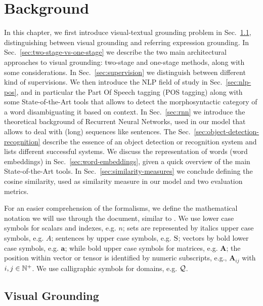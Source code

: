 
\chapter{Background}
\label{ch:background}

In this chapter, we first introduce visual-textual grounding problem
in Sec.~\ref{sec:visual-grounding}, distinguishing between visual
grounding and referring expression grounding. In
Sec.~\ref{sec:two-stage-vs-one-stage} we describe the two main
architectural approaches to visual grounding: two-stage and one-stage
methods, along with some considerations. In Sec.~\ref{sec:supervision}
we distinguish between different kind of supervisions. We then
introduce the NLP field of study in Sec.~\ref{sec:nlp-pos}, and in
particular the Part Of Speech tagging (POS tagging) along with some
State-of-the-Art tools that allows to detect the morphosyntactic
category of a word disambiguating it based on context. In
Sec.~\ref{sec:rnn} we introduce the theoretical background of
Recurrent Neural Networks, used in our model that allows to deal with
(long) sequences like sentences. The
Sec.~\ref{sec:object-detection-recognition} describe the essence of an
object detection or recognition system and lists different successful
systems. We discuss the representation of words (word embeddings) in
Sec.~\ref{sec:word-embeddings}, given a quick overview of the main
State-of-the-Art tools. In Sec.~\ref{sec:similarity-measures} we
conclude defining the cosine similarity, used as similarity measure in
our model and two evaluation metrics.

 For an easier comprehension of the formalisms,
we define the mathematical notation we will use through the document,
similar to \cite{rigoni2021better}. We use lower case symbols for
scalars and indexes, e.g. $n$; sets are represented by italics upper
case symbols, e.g. $A$; sentences by upper case symbols, e.g. $\mathrm{S}$;
vectors by bold lower case symbols, e.g. $\bm{a}$; while bold upper
case symbols for matrices, e.g. $\bm{A}$; the position within vector
or tensor is identified by numeric subscripts, e.g., $\bm{A}_{ij}$
with $i, j \in \mathbb{N}^+$. We use calligraphic symbols for domains, e.g.
$\mathcal{Q}$.

\section{Visual Grounding}
\label{sec:visual-grounding}

